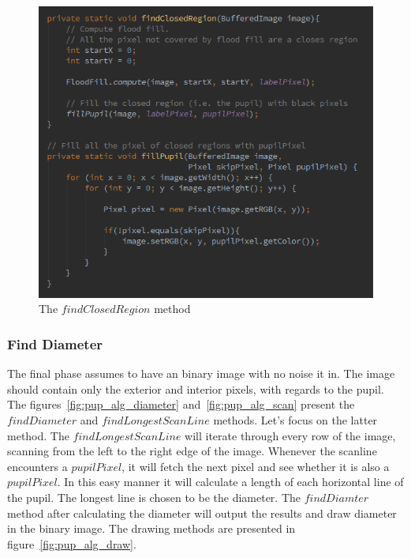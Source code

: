 \documentclass{article}
\begin{document}
%
%
\begin{figure}[H]
\centering

  \includegraphics[width=0.9\linewidth]{res/pupil/alg/findClosedRegion.png}

\caption{The $findClosedRegion$ method}
\label{fig:pup_alg_region}
\end{figure}

\subsubsection{Find Diameter}
The final phase assumes to have an binary image with no noise it in. The image should contain only the exterior and interior pixels, with regards to the pupil. The figures~\ref{fig:pup_alg_diameter} and~\ref{fig:pup_alg_scan} present the $findDiameter$ and $findLongestScanLine$ methods. Let's focus on the latter method. The $findLongestScanLine$ will iterate through every row of the image, scanning from the left to the right edge of the image. Whenever the scanline encounters a $pupilPixel$, it will fetch the next pixel and see whether it is also a $pupilPixel$. In this easy manner it will calculate a length of each horizontal line of the pupil. The longest line is chosen to be the diameter. The $findDiamter$ method after calculating the diameter will output the results and draw diameter in the binary image. The drawing methods are presented in figure~\ref{fig:pup_alg_draw}.
\end{document}
